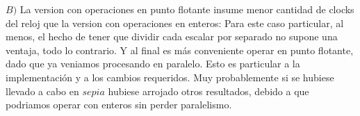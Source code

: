 $B)$ La version con operaciones en punto flotante insume menor cantidad de clocks del reloj que la version con operaciones en enteros: Para este caso particular, al menos, el hecho de tener que dividir cada escalar por separado no supone una ventaja, todo lo contrario. Y al final es más conveniente operar en punto flotante, dado que ya veniamos procesando en paralelo. Esto es particular a la implementación y a los cambios requeridos. Muy probablemente si se hubiese llevado a cabo en $sepia$ hubiese arrojado otros resultados, debido a que podriamos operar con enteros sin perder paralelismo.

